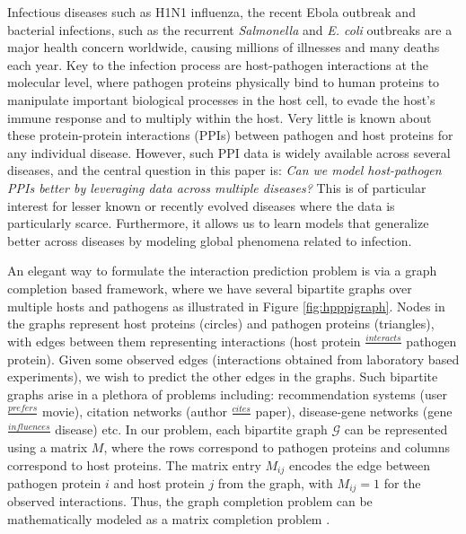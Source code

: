 \documentclass{bioinfo}
\begin{document}
Infectious diseases such as H1N1 influenza, the recent Ebola outbreak and bacterial infections, such as the recurrent \textit{Salmonella} and \textit{E. coli} outbreaks
are a major health concern worldwide, causing millions of illnesses and many deaths each year. 
Key to the infection process are host-pathogen interactions at the molecular level, where pathogen proteins physically bind to human proteins
to manipulate important biological processes in the host cell, to evade the host's immune response and to multiply within the host.
Very little is known about these protein-protein interactions (PPIs) between pathogen and host proteins for any individual disease.
However, such PPI data is widely available across several diseases, and the central question in this
paper is: \emph{Can we model host-pathogen PPIs better by leveraging
data across multiple diseases?} This is of particular interest for 
lesser known or recently evolved diseases where the data is particularly scarce. Furthermore, it
allows us to learn models that generalize better across diseases by
modeling global phenomena related to infection.

An elegant way to formulate the interaction prediction problem is via a graph completion based framework, where we have several bipartite 
graphs over multiple hosts and pathogens as illustrated in Figure \ref{fig:hpppigraph}.
Nodes in the graphs represent host proteins (circles) and pathogen proteins (triangles), with edges between them representing interactions 
(host protein $\frac{interacts}{}$ pathogen protein).
Given some observed edges (interactions obtained from laboratory based experiments), we wish to predict the other edges in the graphs.
Such bipartite graphs arise in a plethora of problems including: recommendation systems (user $\frac{prefers}{}$ movie), 
citation networks (author $\frac{cites}{}$ paper), disease-gene networks (gene $\frac{influences}{}$ disease) etc. 
In our problem, each bipartite graph $\mathcal{G}$ can be represented using a matrix $M$, where the rows correspond to pathogen proteins 
and columns correspond to host proteins.
The matrix entry $M_{ij}$ encodes the edge between pathogen protein $i$ and host protein $j$ from the graph, with $M_{ij}=1$ for the observed interactions. 
Thus, the graph completion problem can be mathematically modeled as a matrix completion problem \citep{candes08}. 
\end{document}

